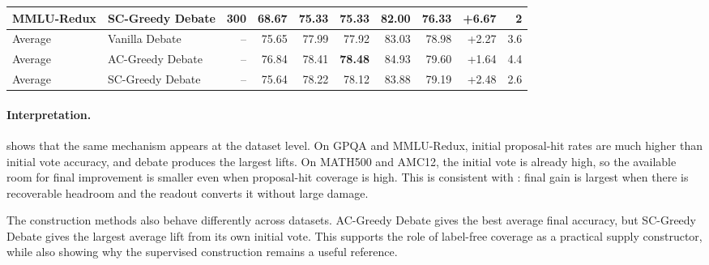 \begin{table}[t]
{\begin{tabular}{llrrrrrrrr}
MMLU-Redux & SC-Greedy Debate & 300 & 68.67 & 75.33 & 75.33 & 82.00 & 76.33 & +6.67 & 2 \\
\midrule
Average & Vanilla Debate & -- & 75.65 & 77.99 & 77.92 & 83.03 & 78.98 & +2.27 & 3.6 \\
Average & AC-Greedy Debate & -- & 76.84 & 78.41 & \textbf{78.48} & 84.93 & 79.60 & +1.64 & 4.4 \\
Average & SC-Greedy Debate & -- & 75.64 & 78.22 & 78.12 & 83.88 & 79.19 & +2.48 & 2.6 \\
\bottomrule
\end{tabular}
}
\label{tab:r5_new_seed_debate}
\end{table}

\paragraph{Interpretation.}
 shows that the same mechanism appears at the
dataset level. On GPQA and MMLU-Redux, initial proposal-hit rates are much
higher than initial vote accuracy, and debate produces the largest lifts. On
MATH500 and AMC12, the initial vote is already high, so the available room for
final improvement is smaller even when proposal-hit coverage is high. This is
consistent with : final gain is
largest when there is recoverable headroom and the readout converts it without
large damage.

The construction methods also behave differently across datasets. AC-Greedy
Debate gives the best average final accuracy, but SC-Greedy Debate gives the
largest average lift from its own initial vote. This supports the role of
label-free coverage as a practical supply constructor, while also showing why
the supervised construction remains a useful reference.
